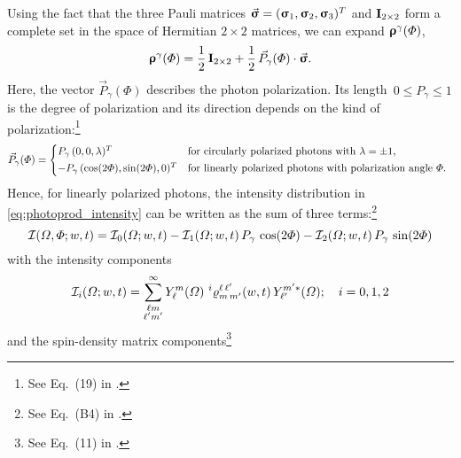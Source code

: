 Using the fact that the three Pauli matrices $\vec{\bm{\mathrm{\upsigma}}} =
(\bm{\mathrm{\upsigma}}_1, \bm{\mathrm{\upsigma}}_2, \bm{\mathrm{\upsigma}}_3)^T$ and
$\bm{\mathrm{I}}_{2 \times 2}$ form a complete set in the space of Hermitian
$2 \times 2$ matrices, we can expand $\bm{\mathrm{\upvarrho}}^\gamma(\Phi)$,
\ie
\begin{equation}
  \bm{\mathrm{\upvarrho}}^\gamma(\Phi)
  = \frac{1}{2}\, \bm{\mathrm{I}}_{2 \times 2} + \frac{1}{2}\, \vec{P}_\gamma(\Phi) \cdot \vec{\bm{\mathrm{\upsigma}}}.
\end{equation}
Here, the vector $\vec{P}_\gamma(\Phi)$ describes the photon
polarization.  Its length~$0 \leq P_\gamma \leq 1$ is the degree of
polarization and its direction depends on the kind of
polarization:\footnote{See Eq.~(19) in .}
\begin{equation}
  \vec{P}_\gamma(\Phi)
  = \begin{cases*}
    P_\gamma\, (0, 0, \lambda)^T                & for circularly polarized photons with $\lambda = \pm 1$, \\
    -P_\gamma\, (\cos(2 \Phi), \sin(2 \Phi), 0)^T & for linearly polarized photons with polarization angle~$\Phi$.
  \end{cases*}
\end{equation}
Hence, for linearly polarized photons, the intensity distribution in
\cref{eq:photoprod_intensity} can be written as the sum of three
terms:\footnote{See Eq.~(B4) in .}
\begin{equation}
  \label{eq:photoprod_intensity_sum}
  \mathcal{I}(\Omega, \Phi; w, t)
  = \mathcal{I}_0(\Omega; w, t)
  - \mathcal{I}_1(\Omega; w, t)\, P_\gamma\, \cos(2 \Phi)
  - \mathcal{I}_2(\Omega; w, t)\, P_\gamma\, \sin(2 \Phi)
\end{equation}
with the intensity components
\begin{equation}
  \label{eq:photoprod_intensity_components}
  \mathcal{I}_i(\Omega; w, t)
  = \sum_{\substack{\ell m \\ \ell' m'}}^\infty
  Y_\ell^m(\Omega)\,
  \prescript{i}{}{\varrho}^{\ell\, \ell'}_{m\, m'}(w, t)\,
  Y_{\ell'}^{m' *}(\Omega);
  \quad i = 0, 1, 2
\end{equation}
and the spin-density matrix components\footnote{See Eq.~(11) in
.}
